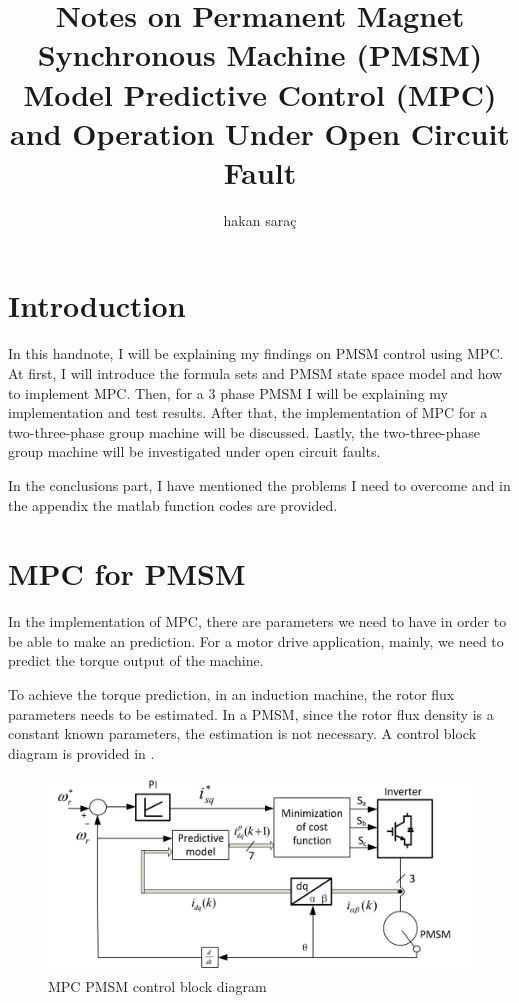\documentclass{article}
\title{Notes on Permanent Magnet Synchronous Machine (PMSM) Model Predictive Control (MPC) and Operation Under Open Circuit Fault}
\author{hakan saraç}
\date{}
\begin{document}
\maketitle

\section{Introduction}
In this handnote, I will be explaining my findings on PMSM control using MPC. At first, I will introduce the formula sets and PMSM state space model and how to implement MPC. Then, for a 3 phase PMSM I will be explaining my implementation and test results. After that, the implementation of MPC for a two-three-phase group machine will be discussed. Lastly, the two-three-phase group machine will be investigated under open circuit faults.

In the conclusions part, I have mentioned the problems I need to overcome and in the appendix the matlab function codes are provided.


\section{MPC for PMSM}
In the implementation of MPC, there are parameters we need to have in order to be able to make an prediction. For a motor drive application, mainly, we need to predict the torque output of the machine. 

To achieve the torque prediction, in an induction machine, the rotor flux parameters needs to be estimated. In a PMSM, since the rotor flux density is a constant known parameters, the estimation is not necessary. A control block diagram is provided in \citep{ExperimentalImplementationOfModelPredictiveControlForPermanentMagnetSynchronousMotor}.

\begin{figure}[H]
\centering
\includegraphics[scale=0.5]{Figures/MPC_PMSM_block_diagram.PNG}
\caption{MPC PMSM control block diagram \citep{ExperimentalImplementationOfModelPredictiveControlForPermanentMagnetSynchronousMotor}}
\label{fig:MpcPmsmBlockDiagram}
\end{figure}
\end{document}
